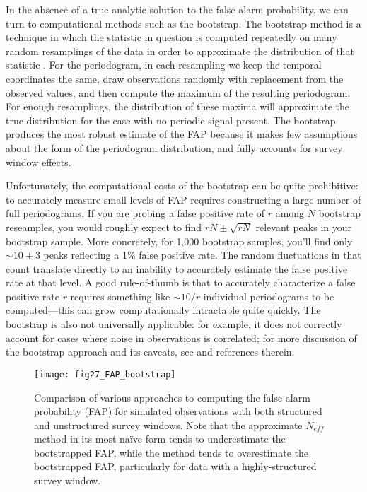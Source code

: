 \documentclass[preprint]{aastex}
\newcommand{\figlabel}[1]{\label{fig:#1}}
\begin{document}
In the absence of a true analytic solution to the false alarm probability,
we can turn to computational methods such as the bootstrap.
The bootstrap method is a technique in which the statistic in question is
computed repeatedly on many random resamplings of the data in order to
approximate the distribution of that statistic
\citep[see][for a useful general discussion of this technique]{ICVG2014}.
For the periodogram, in each resampling we keep the temporal coordinates
the same, draw observations randomly with replacement from the observed
values, and then compute the maximum of the resulting periodogram.
For enough resamplings, the distribution of these maxima will approximate
the true distribution for the case with no periodic signal present.
The bootstrap produces the most robust estimate of the FAP because it makes
few assumptions about the form of the periodogram distribution,
and fully accounts for survey window effects.

Unfortunately, the computational costs of the bootstrap can be quite
prohibitive: to accurately measure small levels of FAP requires constructing
a large number of full periodograms.
If you are probing a false positive rate of $r$ among $N$ bootstrap reseamples,
you would roughly expect to find $rN \pm \sqrt{rN}$ relevant peaks in your
bootstrap sample.
More concretely, for 1,000 bootstrap samples, you'll find only $\sim 10\pm 3$
peaks reflecting a 1\% false positive rate.
The random fluctuations in that count translate directly to an inability to
accurately estimate the false positive rate at that level.
A good rule-of-thumb is that to accurately characterize a false positive rate
$r$ requires
something like $\sim 10 / r$ individual periodograms to be computed---this
can grow computationally intractable quite quickly.
The bootstrap is also not universally applicable: for example, it does not
correctly account for cases where noise in observations is correlated;
for more discussion of the bootstrap approach and its caveats, see
\citet{ICVG2014} and references therein.

\begin{figure}[ht]
  \centering
  \texttt{[image: fig27\_FAP\_bootstrap]}
  \caption{Comparison of various approaches to computing the false alarm
    probability (FAP) for simulated observations with both structured and
    unstructured survey windows. Note that the approximate $N_{eff}$ method
    in its most na{\"i}ve form tends to underestimate the bootstrapped FAP,
    while the \citet{Baluev2008} method tends to overestimate the bootstrapped
    FAP, particularly for data with a highly-structured survey window.
    \figlabel{FAP-bootstrap}}
\end{figure}
\end{document}
